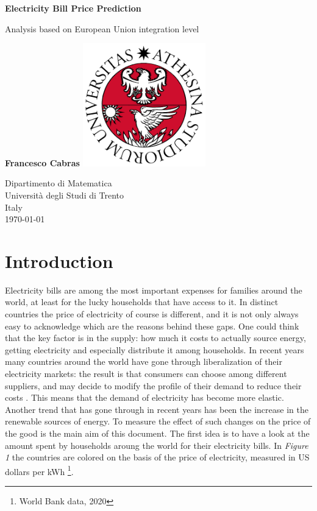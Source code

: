 \documentclass{book}
\begin{document}
\begin{titlepage}
   \begin{center}
       \vspace*{1cm}

       \textbf{Electricity Bill Price Prediction}

       \vspace{0.5cm}
       Analysis based on European Union integration level
            
       \vspace{1.5cm}
       \textbf{Francesco Cabras}
       \vfill
       \includegraphics[width=0.4\textwidth]{Images/unitn.png}            
       \vspace{0.8cm}
            
       Dipartimento di Matematica\\
       Università degli Studi di Trento\\
       Italy\\
       \today
            
   \end{center}
\end{titlepage}

\chapter*{Introduction}

Electricity bills are among the most important expenses for families around the world, at least for the lucky households that have access to it. In distinct countries the price of electricity of course is different, and it is not only always easy to acknowledge which are the reasons behind these gaps. One could think that the key factor is in the supply: how much it costs to actually source energy, getting electricity and especially distribute it among households. In recent years many countries around the world have gone through liberalization of their electricity markets: the result is that consumers can choose among different suppliers, and may decide to modify the profile of their demand to reduce their costs \cite{867149}. This means that the demand of electricity has become more elastic. Another trend that has gone through in recent years has been the increase in the renewable sources of energy. To measure the effect of such changes on the price of the good is the main aim of this document. The first idea is to have a look at the amount spent by households aroung the world for their electricity bills.  In \textit{Figure 1} the countries are colored on the basis of the price of electricity, measured in US dollars per kWh \footnote{World Bank data, 2020}.
\end{document}
